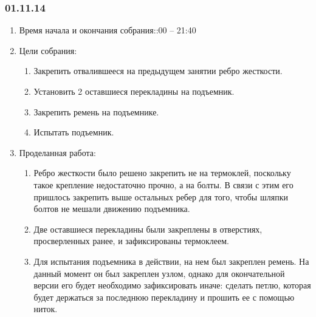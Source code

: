 
\subsubsection{01.11.14}

\begin{enumerate}
	\item Время начала и окончания собрания::00 – 21:40
	\item Цели собрания:\newline
	\begin{enumerate}
	  \item Закрепить отвалившееся на предыдущем занятии ребро жесткости.\newline
	  
	  \item	Установить 2 оставшиеся перекладины на подъемник.\newline
	  
	  \item	Закрепить ремень на подъемнике.\newline
	  
	  \item	Испытать подъемник.\newline
	  
    \end{enumerate}
    
	\item Проделанная работа:\newline
	\begin{enumerate}
	  \item	Ребро жесткости было решено закрепить не на термоклей, поскольку такое крепление недостаточно прочно, а на болты. В связи с этим его пришлось закрепить выше остальных ребер для того, чтобы шляпки болтов не мешали движению подъемника.\newline
      
      \item Две оставшиеся перекладины были закреплены в отверстиях, просверленных ранее, и зафиксированы термоклеем.\newline
      
      \item	Для испытания подъемника в действии, на нем был закреплен ремень. На данный момент он был закреплен узлом, однако для окончательной версии его будет необходимо зафиксировать иначе: сделать петлю, которая будет держаться за последнюю перекладину и прошить ее с помощью ниток.\newline
      

\end{enumerate}
\end{enumerate}
